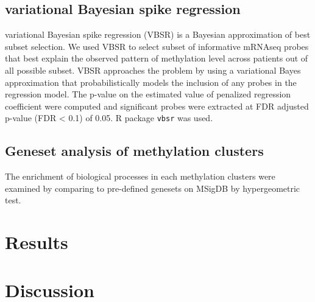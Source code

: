 \documentclass{article}
\begin{document}
\subsection{variational Bayesian spike regression}
variational Bayesian spike regression (VBSR) \cite{logsdon2012novel} is a Bayesian approximation of best subset selection. We used VBSR to select subset of informative mRNAseq probes that best explain the observed pattern of methylation level across patients out of all possible subset. VBSR approaches the problem by using a variational Bayes approximation that probabilistically models the inclusion of any probes in the regression model. The p-value on the estimated value of penalized regression coefficient were computed and significant probes were extracted at FDR adjusted p-value (FDR < 0.1) of 0.05. R package \texttt{vbsr} was used. 

\subsection{Geneset analysis of methylation clusters}
The enrichment of biological processes in each methylation clusters were examined by comparing to pre-defined genesets on MSigDB by hypergeometric test. 

\section{Results}

\section{Discussion}



\end{document}

